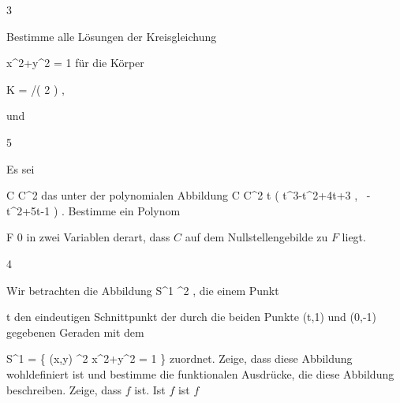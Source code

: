 {3}
{
Bestimme alle Lösungen der Kreisgleichung

\mavergleichskettedisp
{\vergleichskette
{ x^2+y^2
}
{ =} { 1
}
{ } {
}
{ } {
}
{ } {
}
}
{}{}{}
für die Körper

\mavergleichskette
{\vergleichskette
{ K
}
{ = }{ \Z/( 2 )
}
{  }{
}
{    }{
}
{   }{
}
}
{}{}{,}

 und

}
{} {}


{5}
{
Es sei

\mavergleichskette
{\vergleichskette
{ C
}
{ \subseteq }{ {\mathbb C}^2
}
{  }{
}
{    }{
}
{   }{
}
}
{}{}{}
das
unter der polynomialen Abbildung
\maabbeledisp {} { {\mathbb C} } { {\mathbb C}^2
} { t } { \left( t^3-t^2+4t+3  , \,   -t^2+5t-1                   \right)
} {.}
Bestimme ein Polynom

\mavergleichskette
{\vergleichskette
{ F
}
{ \neq }{ 0
}
{  }{
}
{    }{
}
{   }{
}
}
{}{}{}
in zwei Variablen derart, dass $C$ auf dem Nullstellengebilde zu $F$ liegt.

}
{} {}


{4}
{
Wir betrachten die Abbildung
 {\R} {S^1 \subseteq \R^2
} {,}
die einem Punkt

\mavergleichskette
{\vergleichskette
{ t
}
{ \in }{ \R
}
{  }{
}
{    }{
}
{   }{
}
}
{}{}{}
den eindeutigen Schnittpunkt
 der durch die beiden Punkte
\mathkor {} {(t,1)} {und} {(0,-1)} {}
gegebenen Geraden
 mit dem

\mavergleichskettedisp
{\vergleichskette
{ S^1
}
{ =} { \left\{ (x,y) \in \R^2  \mid   x^2+y^2 = 1        \right\}
}
{ } {
}
{ } {
}
{ } {
}
}
{}{}{}
zuordnet. Zeige, dass diese Abbildung wohldefiniert ist und bestimme die funktionalen Ausdrücke, die diese Abbildung beschreiben. Zeige, dass $f$
ist. Ist $f$
ist $f$

}
{} {}
